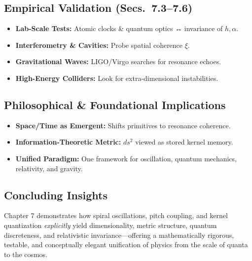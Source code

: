 \subsection{Empirical Validation (Secs.~7.3–7.6)}
\begin{itemize}
  \item \textbf{Lab-Scale Tests:} Atomic clocks \& quantum optics ↔ invariance of \(h,\alpha\).
  \item \textbf{Interferometry \& Cavities:} Probe spatial coherence \(\xi\).
  \item \textbf{Gravitational Waves:} LIGO/Virgo searches for resonance echoes.
  \item \textbf{High-Energy Colliders:} Look for extra-dimensional instabilities.
\end{itemize}

\subsection{Philosophical \& Foundational Implications}
\begin{itemize}
  \item \textbf{Space/Time as Emergent:} Shifts primitives to resonance coherence.
  \item \textbf{Information-Theoretic Metric:} \(ds^2\) viewed as stored kernel memory.
  \item \textbf{Unified Paradigm:} One framework for oscillation, quantum mechanics, relativity, and gravity.
\end{itemize}

\subsection{Concluding Insights}
Chapter 7 demonstrates how spiral oscillations, pitch coupling, and kernel quantization \emph{explicitly} yield dimensionality, metric structure, quantum discreteness, and relativistic invariance—offering a mathematically rigorous, testable, and conceptually elegant unification of physics from the scale of quanta to the cosmos.  


